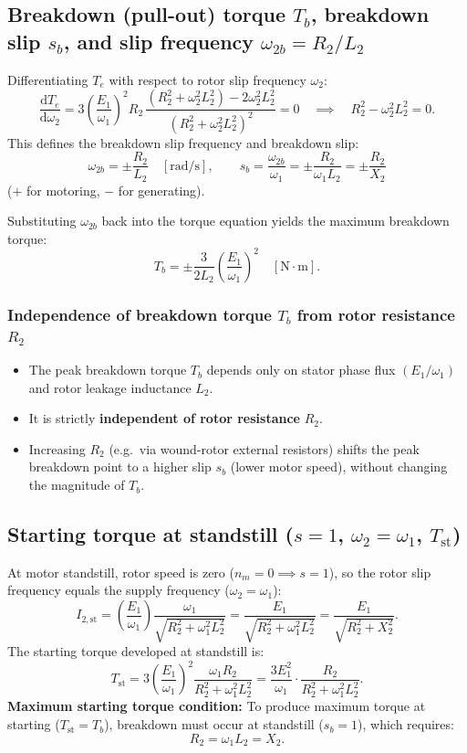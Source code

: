\subsection{Breakdown (pull-out) torque \texorpdfstring{$T_b$}{T_b}, breakdown slip \texorpdfstring{$s_b$}{s_b}, and slip frequency \texorpdfstring{$\omega_{2b} = R_2/L_2$}{omega_2b = R_2/L_2}}
Differentiating \(T_e\) with respect to rotor slip frequency \(\omega_2\):
\[
\frac{\mathrm{d}T_e}{\mathrm{d}\omega_2} = 3\left(\frac{E_1}{\omega_1}\right)^2 R_2\,\frac{(R_2^2 + \omega_2^2 L_2^2) - 2\omega_2^2 L_2^2}{(R_2^2 + \omega_2^2 L_2^2)^2} = 0
\quad\implies\quad
R_2^2 - \omega_2^2 L_2^2 = 0.
\]
This defines the breakdown slip frequency and breakdown slip:
\[
\omega_{2b} = \pm \frac{R_2}{L_2} \quad [\mathrm{rad/s}],
\qquad
s_b = \frac{\omega_{2b}}{\omega_1} = \pm \frac{R_2}{\omega_1 L_2} = \pm \frac{R_2}{X_2}
\]
(\(+\) for motoring, \(-\) for generating).

Substituting \(\omega_{2b}\) back into the torque equation yields the maximum breakdown torque:
\[
T_b = \pm \frac{3}{2 L_2}\left(\frac{E_1}{\omega_1}\right)^2 \quad [\mathrm{N\cdot m}].
\]

\subsubsection{Independence of breakdown torque \texorpdfstring{$T_b$}{T_b} from rotor resistance \texorpdfstring{$R_2$}{R_2}}
\begin{itemize}
  \item The peak breakdown torque \(T_b\) depends only on stator phase flux \((E_1/\omega_1)\) and rotor leakage inductance \(L_2\).
  \item It is strictly \textbf{independent of rotor resistance} \(R_2\).
  \item Increasing \(R_2\) (e.g.\ via wound-rotor external resistors) shifts the peak breakdown point to a higher slip \(s_b\) (lower motor speed), without changing the magnitude of \(T_b\).
\end{itemize}

\subsection{Starting torque at standstill (\texorpdfstring{$s=1$, $\omega_2=\omega_1$, $T_{\mathrm{st}}$}{s=1, omega_2=omega_1, T_st})}
At motor standstill, rotor speed is zero (\(n_m = 0 \implies s = 1\)), so the rotor slip frequency equals the supply frequency (\(\omega_2 = \omega_1\)):
\[
I_{2,\mathrm{st}} = \left(\frac{E_1}{\omega_1}\right)\frac{\omega_1}{\sqrt{R_2^2 + \omega_1^2 L_2^2}} = \frac{E_1}{\sqrt{R_2^2 + \omega_1^2 L_2^2}} = \frac{E_1}{\sqrt{R_2^2 + X_2^2}}.
\]
The starting torque developed at standstill is:
\[
T_{\mathrm{st}} = 3\left(\frac{E_1}{\omega_1}\right)^2\frac{\omega_1 R_2}{R_2^2 + \omega_1^2 L_2^2}
= \frac{3 E_1^2}{\omega_1}\cdot\frac{R_2}{R_2^2 + \omega_1^2 L_2^2}.
\]
\textbf{Maximum starting torque condition:}
To produce maximum torque at starting (\(T_{\mathrm{st}} = T_b\)), breakdown must occur at standstill (\(s_b = 1\)), which requires:
\[
R_2 = \omega_1 L_2 = X_2.
\]

